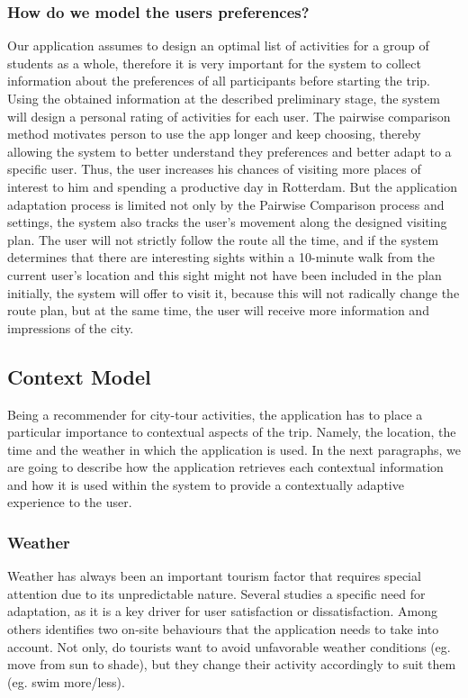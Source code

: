 \documentclass[11pt,a4paper,oneside]{article}
\begin{document}
\subsubsection{How do we model the users preferences?}
Our application assumes to design an optimal list of activities for a group of students as a whole, therefore it is very important for the system to collect information about the preferences of all participants before starting the trip. Using the obtained information at the described preliminary stage, the system will design a personal rating of activities for each user. The pairwise comparison method motivates person to use the app longer and keep choosing, thereby allowing the system to better understand they preferences and better adapt to a specific user. Thus, the user increases his chances of visiting more places of interest to him and spending a productive day in Rotterdam. But the application adaptation process is limited not only by the Pairwise Comparison process and settings, the system also tracks the user's movement along the designed visiting plan. The user will not strictly follow the route all the time, and if the system determines that there are interesting sights within a 10-minute walk from the current user's location and this sight might not have been included in the plan initially, the system will offer to visit it, because this will not radically change the route plan, but at the same time, the user will receive more information and impressions of the city.
\subsection{Context Model}
\label{context}
Being a recommender for city-tour activities, the application has to place a particular importance to contextual aspects of the trip. Namely, the location, the time and the weather in which the application is used. In the next paragraphs, we are going to describe how the application retrieves each contextual information and how it is used within the system to provide a contextually adaptive experience to the user.



\subsubsection{Weather}
Weather has always been an important tourism factor that requires special attention due to its unpredictable nature. Several studies a specific need for adaptation, as it is a key driver for user satisfaction or dissatisfaction.\cite{becken_ImportanceClimateWeather_2010} Among others \citeauthor{defreitas_TourismClimatologyEvaluating_2003} identifies two on-site behaviours that the application needs to take into account. Not only, do tourists want to avoid unfavorable weather conditions (eg. move from sun to shade), but they change their activity accordingly to suit them (eg. swim more/less). 
\end{document}
